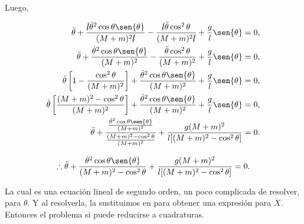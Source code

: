 \documentclass[a4paper,10pt]{article}
\numberwithin{equation}{section}
\begin{document}
Luego,

\begin{align*}
 \ddot{\theta} + \frac{\cancel{l}\dot{\theta}^2\cos{\theta}\sen{\theta}}{(M+m)^2\cancel{l}} - \frac{\cancel{l}\ddot{\theta}\cos^2{\theta}}{(M+m)^2\cancel{l}}
 + \frac{g}{l}\sen{\theta} = 0, \\
 \ddot{\theta} + \frac{\dot{\theta}^2\cos{\theta}\sen{\theta}}{(M+m)^2} - \frac{\ddot{\theta}\cos^2{\theta}}{(M+m)^2}
 + \frac{g}{l}\sen{\theta} = 0, \\
 \ddot{\theta}\left[1 - \frac{\cos^2{\theta}}{(M+m)^2} \right] + \frac{\dot{\theta}^2\cos{\theta}\sen{\theta}}{(M+m)^2}
 + \frac{g}{l}\sen{\theta} = 0, \\
\ddot{\theta}\left[\frac{(M+m)^2 - \cos^2{\theta}}{(M+m)^2} \right]+ \frac{\dot{\theta}^2\cos{\theta}\sen{\theta}}{(M+m)^2}
 + \frac{g}{l}\sen{\theta} = 0, \\
 \ddot{\theta} + \frac{\frac{\dot{\theta}^2\cos{\theta}\sen{\theta}}{(M+m)^2}}{\frac{(M+m)^2 - \cos^2{\theta}}{(M+m)^2}}
 + \frac{g(M+m)^2}{l[(M+m)^2-\cos^2{\theta}]} = 0.
\end{align*}

\begin{equation}
 \therefore \ddot{\theta} + \frac{\dot{\theta}^2\cos{\theta}\sen{\theta}}{(M+m)^2 - \cos^2{\theta}} 
  + \frac{g(M+m)^2}{l[(M+m)^2-\cos^2{\theta}]} = 0.
\end{equation}

La cual es una ecuación lineal de segundo orden, un poco complicada de resolver, 
para $\theta$. Y al resolverla, la sustituimos en  para obtener 
una expresión para $\dot{X}$. Entonces el problema si puede reducirse a cuadraturas.
 
% 
% 
% 
\end{document}
